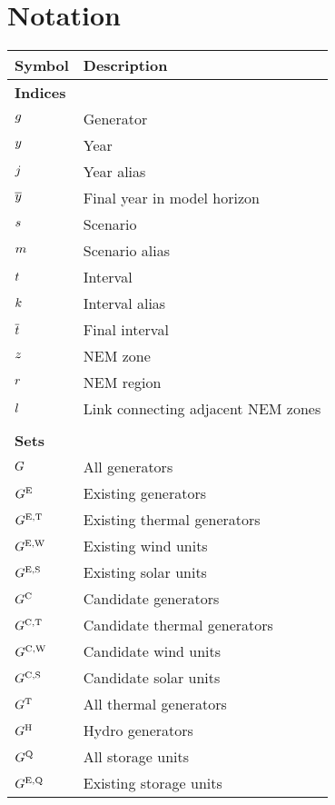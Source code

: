 \documentclass{article}
\begin{document}
\section{Notation}
\renewcommand*{\arraystretch}{1.3}
\begin{longtable}{ p{}  p{}}
	\textbf{Symbol} & \textbf{Description}\\
	\hline\hline
	\multicolumn{2}{l}{\textbf{Indices}}\\
	$g$ & Generator\\ 
	$y$ & Year\\
	$j$ & Year alias\\
	$\overline{y}$ & Final year in model horizon\\
	$s$ & Scenario\\
	$m$ & Scenario alias\\
	$t$ & Interval\\
	$k$ & Interval alias\\
	$\overline{t}$ & Final interval\\
	$z$ & NEM zone\\
	$r$ & NEM region\\
	$l$ & Link connecting adjacent NEM zones\\
	& \\
	\multicolumn{2}{l}{\textbf{Sets}}\\
	$G$ & All generators\\
	$G^{\mathrm{E}}$ & Existing generators\\
	$G^{\mathrm{E,T}}$ & Existing thermal generators\\
	$G^{\mathrm{E,W}}$ & Existing wind units\\
	$G^{\mathrm{E,S}}$ & Existing solar units\\
	$G^{\mathrm{C}}$ & Candidate generators\\
	$G^{\mathrm{C,T}}$ & Candidate thermal generators\\
	$G^{\mathrm{C,W}}$ & Candidate wind units\\
	$G^{\mathrm{C,S}}$ & Candidate solar units\\
	$G^{\mathrm{T}}$ & All thermal generators\\
	$G^{\mathrm{H}}$ & Hydro generators\\
	$G^{\mathrm{Q}}$ & All storage units\\
	$G^{\mathrm{E,Q}}$ & Existing storage units\\

\end{longtable}
\end{document}
